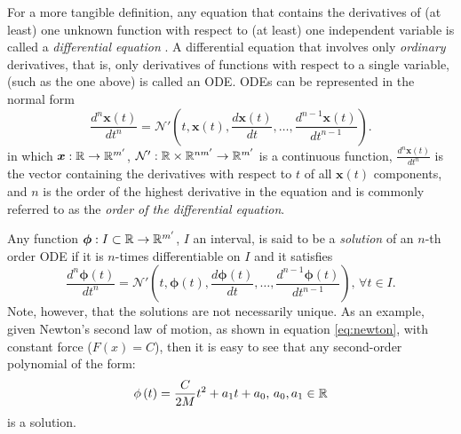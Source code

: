 For a more tangible definition, any equation that contains the derivatives of (at least) one unknown function with respect to (at least) one independent variable is called a \emph{differential equation} \cite{zill_first_2013}.
A differential equation that involves only \emph{ordinary} derivatives, that is, only derivatives of functions with respect to a single variable, (such as the one above) is called an \gls{ODE}.
\gls{ODE}s can be represented in the normal form \[
    \frac{d^n \bm{x}(t)}{d t^{n}} = \mathcal{N}'\left( t, \bm{x}\left( t \right), \frac{d \bm{x}(t)}{d t}, \ldots,\frac{d^{n-1}\bm{x}(t)}{d t^{n-1}} \right)
.\] 
in which $\bm{x}:\mathbb{R}\to \mathbb{R}^{m'} $, $\mathcal{N}':\mathbb{R}\times \mathbb{R}^{nm'}\to \mathbb{R}^{m'}$ is a continuous function, $\frac{d^n \bm{x}(t)}{d t^{n}}$ is the vector containing the derivatives with respect to $t$ of all $\bm{x}\left( t \right) $ components, and $n$ is the order of the highest derivative in the equation and is commonly referred to as the \emph{order of the differential equation}.

Any function $\bm{\phi}:I\subset\mathbb{R}\to \mathbb{R}^{m'}$, $I$ an interval, is said to be a \emph{solution} of an $n$-th order \gls{ODE} if it is $n$-times differentiable on $I$ and it satisfies
\[
    \frac{d^n \bm{\phi}(t)}{d t^{n}} = \mathcal{N}'\left( t, \bm{\phi}\left( t \right) , \frac{d \bm{\phi}(t)}{d t}, \ldots,\frac{d^{n-1}\bm{\phi}(t)}{d t^{n-1}} \right),\,\forall t\in I
.\]
Note, however, that the solutions are not necessarily unique.
As an example, given Newton's second law of motion, as shown in equation \eqref{eq:newton}, with constant force ($F(x)=C$), then it is easy to see that any second-order polynomial of the form:
\[
    \phi\left( t \right) = \frac{C}{2M}t^2 + a_1t + a_0,\, a_0,a_1\in \mathbb{R}
\]
is a solution.

